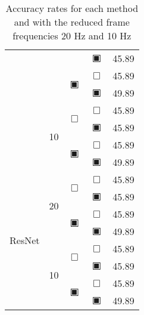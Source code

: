 \begin{table}[H]
\begin{tabular}{|c|c|c|c|c|}
				    &                    &                         & $\blackinwhitesquare$ & 45.89 \\\cline{3-6}
				    &                    & \multirow{2}{*}{$\blackinwhitesquare$} & $\Box$ & 45.89 \\\cline{4-6}
				    &                    &                         & $\blackinwhitesquare$ & 49.89 \\\cline{2-6}
				    & \multirow{4}{*}{10} & \multirow{2}{*}{$\Box$} & $\Box$ & 45.89 \\\cline{4-6}
				    &                     &                         & $\blackinwhitesquare$ & 45.89 \\\cline{3-6}
				    &                     & \multirow{2}{*}{$\blackinwhitesquare$} & $\Box$ & 45.89 \\\cline{4-6}
				    &                     &                         & $\blackinwhitesquare$ & 49.89 \\\cline{2-6}
		\hline\hline
		\multirow{8}{*}{ResNet}& \multirow{4}{*}{20} & \multirow{2}{*}{$\Box$} & $\Box$ & 45.89 \\\cline{4-6}
				       &                    &                         & $\blackinwhitesquare$ & 45.89 \\\cline{3-6}
				       &                    & \multirow{2}{*}{$\blackinwhitesquare$} & $\Box$ & 45.89 \\\cline{4-6}
				       &                    &                         & $\blackinwhitesquare$ & 49.89 \\\cline{2-6}
				       & \multirow{4}{*}{10} & \multirow{2}{*}{$\Box$} & $\Box$ & 45.89 \\\cline{4-6}
				       &                     &                         & $\blackinwhitesquare$ & 45.89 \\\cline{3-6}
				       &                     & \multirow{2}{*}{$\blackinwhitesquare$} & $\Box$ & 45.89 \\\cline{4-6}
				       &                     &                         & $\blackinwhitesquare$ & 49.89 \\\cline{2-6}
		\hline\hline
	\end{tabular}
	\caption{Accuracy rates for each method and with the reduced frame frequencies 20 Hz and 10 Hz}
	\label{tab:stats_frequency_121}
\end{table}
